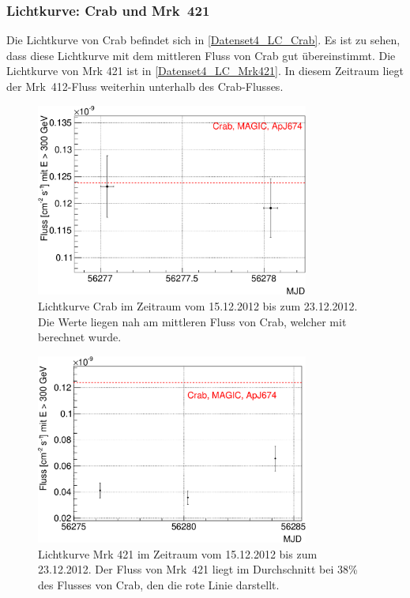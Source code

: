 \subsubsection{Lichtkurve: Crab und Mrk~421}
Die Lichtkurve von Crab befindet sich in \autoref{Datenset4_LC_Crab}. 
Es ist zu sehen, dass diese Lichtkurve mit dem mittleren Fluss von Crab gut übereinstimmt.
Die Lichtkurve von Mrk 421 ist in \autoref{Datenset4_LC_Mrk421}. 
In diesem Zeitraum liegt der Mrk~412-Fluss weiterhin unterhalb des Crab-Flusses.

\begin{figure}
    \centering
    \includegraphics[width=0.8\textwidth]{./Plots/04_MrkAnalyse/Datenset4/Datenset4_LC_Crab.pdf}
    \caption{Lichtkurve Crab im Zeitraum vom 15.12.2012 bis zum 23.12.2012.
    Die Werte liegen nah am mittleren Fluss von Crab, welcher mit \cite{LiteraturreferenzMAGIC} berechnet wurde.}
    \label{Datenset4_LC_Crab}
\end{figure}

\begin{figure}
    \centering
    \includegraphics[width=0.8\textwidth]{./Plots/04_MrkAnalyse/Datenset4/Datenset4_LC_Mrk421.pdf}
    \caption{Lichtkurve Mrk 421 im Zeitraum vom 15.12.2012 bis zum 23.12.2012.
    Der Fluss von Mrk~421 liegt im Durchschnitt bei 38\% des Flusses von Crab, den die rote Linie darstellt.}
    \label{Datenset4_LC_Mrk421}
\end{figure}


